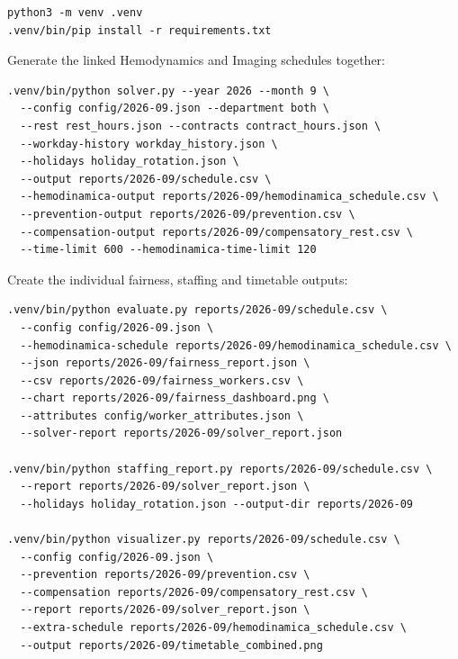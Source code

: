 \documentclass[11pt,a4paper]{article}
\begin{document}
\begin{small}
\begin{verbatim}
python3 -m venv .venv
.venv/bin/pip install -r requirements.txt
\end{verbatim}
\end{small}

Generate the linked Hemodynamics and Imaging schedules together:

\begin{small}
\begin{verbatim}
.venv/bin/python solver.py --year 2026 --month 9 \
  --config config/2026-09.json --department both \
  --rest rest_hours.json --contracts contract_hours.json \
  --workday-history workday_history.json \
  --holidays holiday_rotation.json \
  --output reports/2026-09/schedule.csv \
  --hemodinamica-output reports/2026-09/hemodinamica_schedule.csv \
  --prevention-output reports/2026-09/prevention.csv \
  --compensation-output reports/2026-09/compensatory_rest.csv \
  --time-limit 600 --hemodinamica-time-limit 120
\end{verbatim}
\end{small}

Create the individual fairness, staffing and timetable outputs:

\begin{small}
\begin{verbatim}
.venv/bin/python evaluate.py reports/2026-09/schedule.csv \
  --config config/2026-09.json \
  --hemodinamica-schedule reports/2026-09/hemodinamica_schedule.csv \
  --json reports/2026-09/fairness_report.json \
  --csv reports/2026-09/fairness_workers.csv \
  --chart reports/2026-09/fairness_dashboard.png \
  --attributes config/worker_attributes.json \
  --solver-report reports/2026-09/solver_report.json

.venv/bin/python staffing_report.py reports/2026-09/schedule.csv \
  --report reports/2026-09/solver_report.json \
  --holidays holiday_rotation.json --output-dir reports/2026-09

.venv/bin/python visualizer.py reports/2026-09/schedule.csv \
  --config config/2026-09.json \
  --prevention reports/2026-09/prevention.csv \
  --compensation reports/2026-09/compensatory_rest.csv \
  --report reports/2026-09/solver_report.json \
  --extra-schedule reports/2026-09/hemodinamica_schedule.csv \
  --output reports/2026-09/timetable_combined.png
\end{verbatim}
\end{small}
\end{document}

